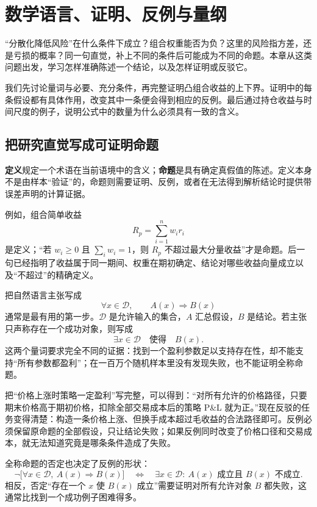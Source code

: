 \chapter{数学语言、证明、反例与量纲}
\label{ch:language-proof-dimension}

“分散化降低风险”在什么条件下成立？组合权重能否为负？这里的风险指方差，还是亏损的概率？同一句直觉，补上不同的条件后可能成为不同的命题。本章从这类问题出发，学习怎样准确陈述一个结论，以及怎样证明或反驳它。

我们先讨论量词与必要、充分条件，再完整证明凸组合收益的上下界。证明中的每条假设都有具体作用，改变其中一条便会得到相应的反例。最后通过持仓收益与时间尺度的例子，说明公式中的数量为什么必须具有一致的含义。

\section{把研究直觉写成可证明命题}

\textbf{定义}规定一个术语在当前语境中的含义；\textbf{命题}是具有确定真假值的陈述。定义本身不是由样本“验证”的，命题则需要证明、反例，或者在无法得到解析结论时提供带误差声明的计算证据。

例如，组合简单收益
\[
  R_p=\sum_{i=1}^n w_i r_i
\]
是定义；“若 $w_i\geq0$ 且 $\sum_iw_i=1$，则 $R_p$ 不超过最大分量收益”才是命题。后一句已经指明了收益属于同一期间、权重在期初确定、结论对哪些收益向量成立以及“不超过”的精确定义。

把自然语言主张写成
\[
  \forall x\in\mathcal D,\qquad A(x)\Longrightarrow B(x)
\]
通常是最有用的第一步。$\mathcal D$ 是允许输入的集合，$A$ 汇总假设，$B$ 是结论。若主张只声称存在一个成功对象，则写成
\[
  \exists x\in\mathcal D\quad\text{使得}\quad B(x).
\]
这两个量词要求完全不同的证据：找到一个盈利参数足以支持存在性，却不能支持“所有参数都盈利”；在一百万个随机样本里没有发现失败，也不能证明全称命题。

把“价格上涨时策略一定盈利”写完整，可以得到：“对所有允许的价格路径，只要期末价格高于期初价格，扣除全部交易成本后的策略 P\&L 就为正。”现在反驳的任务变得清楚：构造一条价格上涨、但换手成本超过毛收益的合法路径即可。反例必须保留原命题的全部假设，只让结论失败；如果反例同时改变了价格口径和交易成本，就无法知道究竟是哪条条件造成了失败。

全称命题的否定也决定了反例的形状：
\[
  \neg\bigl[\forall x\in\mathcal D,\ A(x)\Rightarrow B(x)\bigr]
  \quad\Longleftrightarrow\quad
  \exists x\in\mathcal D:\ A(x)\text{ 成立且 }B(x)\text{ 不成立}.
\]
相反，否定“存在一个 $x$ 使 $B(x)$ 成立”需要证明对所有允许对象 $B$ 都失败，这通常比找到一个成功例子困难得多。

